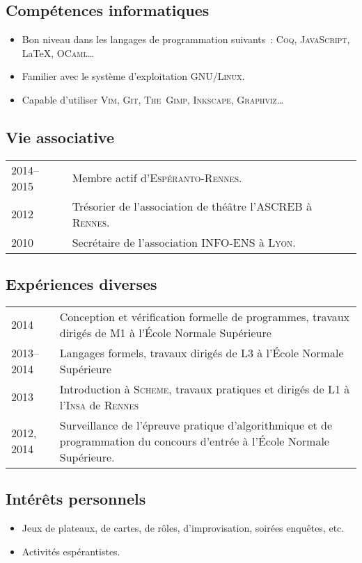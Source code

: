 \documentclass[12pt,a4paper]{article}
\makeatletter
\newenvironment{datecvsection}[1]%
               {\subsection*{#1}%
                 \noindent \begin{tabular}{@{}p{\annee}p{\texte}@{}}}
               {\end{tabular}}
\newenvironment{itemcvsection}[1]%
               {\subsection*{#1}\begin{itemize}}
               {\end{itemize}}
\makeatother
\begin{document}
\begin{itemcvsection}{Compétences informatiques}

  \item Bon niveau dans les langages de programmation suivants~:  \textsc{Coq}, \textsc{JavaScript}, \LaTeX, \textsc{OCaml}\ldots
  \item Familier avec le système d’exploitation \textsc{GNU/Linux}.
  \item Capable d’utiliser \textsc{Vim}, \textsc{Git}, \textsc{The~Gimp}, \textsc{Inkscape}, \textsc{Graphviz}\ldots

\end{itemcvsection}

\begin{datecvsection}{Vie associative}

    2014–2015 & Membre actif d’\textsc{Espéranto-Rennes}. \\
	2012 & Trésorier de l’association de théâtre l’\textsc{ASCREB} à \textsc{Rennes}. \\
	2010 & Secrétaire de l’association \textsc{INFO-ENS} à \textsc{Lyon}. \\

\end{datecvsection}

\begin{datecvsection}{Expériences diverses}

    2014 & Conception et vérification formelle de programmes, travaux dirigés de M1 à l’École Normale Supérieure \\

    2013–2014 & Langages formels, travaux dirigés de L3 à l’École Normale Supérieure \\

    2013 & Introduction à \textsc{Scheme}, travaux pratiques et dirigés de L1 à l’\textsc{Insa} de \textsc{Rennes} \\

	2012, 2014 & Surveillance de l’épreuve pratique d’algorithmique et de programmation du concours d’entrée à l’École Normale Supérieure.

\end{datecvsection}

\begin{itemcvsection}{Intérêts personnels}

  \item Jeux de plateaux, de cartes, de rôles, d’improvisation, soirées enquêtes, etc.
  \item Activités espérantistes.

\end{itemcvsection}
\end{document}
